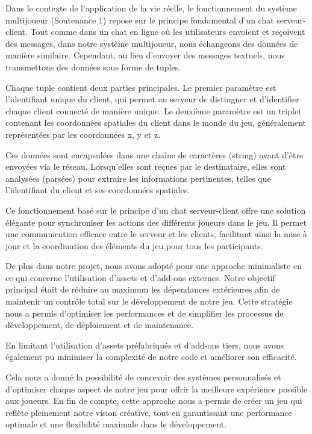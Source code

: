 \documentclass[
	article,			%
	11pt,				%
	oneside,			%
	a4paper,			%
	chapter=TITLE,
	french,			%
	sumario=tradicional
	]{base_nt}
\begin{document}
Dans le contexte de l'application de la vie réelle, le fonctionnement du système multijoueur (Soutenance 1) repose sur le principe fondamental d'un chat serveur-client. Tout comme dans un chat en ligne où les utilisateurs envoient et reçoivent des messages, dans notre système multijoueur, nous échangeons des données de manière similaire. Cependant, au lieu d'envoyer des messages textuels, nous transmettons des données sous forme de tuples.

Chaque tuple contient deux parties principales. Le premier paramètre est l'identifiant unique du client, qui permet au serveur de distinguer et d'identifier chaque client connecté de manière unique. Le deuxième paramètre est un triplet contenant les coordonnées spatiales du client dans le monde du jeu, généralement représentées par les coordonnées x, y et z.

Ces données sont encapsulées dans une chaîne de caractères (string) avant d'être envoyées via le réseau. Lorsqu'elles sont reçues par le destinataire, elles sont analysées (parsées) pour extraire les informations pertinentes, telles que l'identifiant du client et ses coordonnées spatiales.

Ce fonctionnement basé sur le principe d'un chat serveur-client offre une solution élégante pour synchroniser les actions des différents joueurs dans le jeu. Il permet une communication efficace entre le serveur et les clients, facilitant ainsi la mise à jour et la coordination des éléments du jeu pour tous les participants.

\newpage

De plus dans notre projet, nous avons adopté pour une approche minimaliste en ce qui concerne l'utilisation d'assets et d'add-ons externes. Notre objectif principal était de réduire au maximum les dépendances extérieures afin de maintenir un contrôle total sur le développement de notre jeu. Cette stratégie nous a permis d'optimiser les performances et de simplifier les processus de développement, de déploiement et de maintenance.

En limitant l'utilisation d'assets préfabriqués et d'add-ons tiers, nous avons également pu minimiser la complexité de notre code et améliorer son efficacité.

Cela nous a donné la possibilité de concevoir des systèmes personnalisés et d'optimiser chaque aspect de notre jeu pour offrir la meilleure expérience possible aux joueurs. En fin de compte, cette approche nous a permis de créer un jeu qui reflète pleinement notre vision créative, tout en garantissant une performance optimale et une flexibilité maximale dans le développement.
\end{document}
